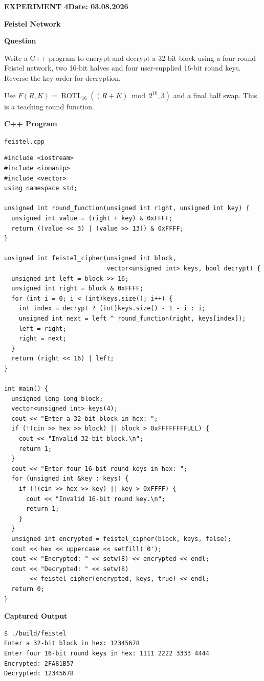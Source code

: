 \documentclass[11pt,a4paper]{article}
\newcommand{\blocktitle}[1]{\Needspace{6\baselineskip}\par\textbf{#1}\par}
\begin{document}
\clearpage
{}\label{exp:feistel}
{\small\bfseries EXPERIMENT 4\hfill Date: 03.08.2026\par}
{\Large\bfseries Feistel Network\par}
\vspace{2mm}
\blocktitle{Question}
Write a C++ program to encrypt and decrypt a 32-bit block using a four-round Feistel network, two 16-bit halves and four user-supplied 16-bit round keys. Reverse the key order for decryption.

Use $F(R,K)=\operatorname{ROTL}_{16}((R+K)\bmod 2^{16},3)$ and a final half swap. This is a teaching round function.

\blocktitle{C++ Program}
{\small\texttt{feistel.cpp}\par}
\begin{lstlisting}[style=cpp]
#include <iostream>
#include <iomanip>
#include <vector>
using namespace std;

unsigned int round_function(unsigned int right, unsigned int key) {
  unsigned int value = (right + key) & 0xFFFF;
  return ((value << 3) | (value >> 13)) & 0xFFFF;
}

unsigned int feistel_cipher(unsigned int block,
                            vector<unsigned int> keys, bool decrypt) {
  unsigned int left = block >> 16;
  unsigned int right = block & 0xFFFF;
  for (int i = 0; i < (int)keys.size(); i++) {
    int index = decrypt ? (int)keys.size() - 1 - i : i;
    unsigned int next = left ^ round_function(right, keys[index]);
    left = right;
    right = next;
  }
  return (right << 16) | left;
}

int main() {
  unsigned long long block;
  vector<unsigned int> keys(4);
  cout << "Enter a 32-bit block in hex: ";
  if (!(cin >> hex >> block) || block > 0xFFFFFFFFULL) {
    cout << "Invalid 32-bit block.\n";
    return 1;
  }
  cout << "Enter four 16-bit round keys in hex: ";
  for (unsigned int &key : keys) {
    if (!(cin >> hex >> key) || key > 0xFFFF) {
      cout << "Invalid 16-bit round key.\n";
      return 1;
    }
  }
  unsigned int encrypted = feistel_cipher(block, keys, false);
  cout << hex << uppercase << setfill('0');
  cout << "Encrypted: " << setw(8) << encrypted << endl;
  cout << "Decrypted: " << setw(8)
       << feistel_cipher(encrypted, keys, true) << endl;
  return 0;
}
\end{lstlisting}
\par\begin{minipage}{\linewidth}
\textbf{Captured Output}\par
\begin{lstlisting}[style=terminal]
$ ./build/feistel
Enter a 32-bit block in hex: 12345678
Enter four 16-bit round keys in hex: 1111 2222 3333 4444
Encrypted: 2FA81B57
Decrypted: 12345678
\end{lstlisting}
\end{minipage}
\end{document}
